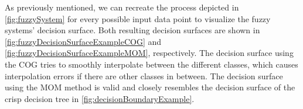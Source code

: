 As previously mentioned, we can recreate the process depicted in \autoref{fig:fuzzySystem} for every possible input data point to visualize the fuzzy systems' decision surface. Both resulting decision surfaces are shown in \autoref{fig:fuzzyDecisionSurfaceExampleCOG} and \autoref{fig:fuzzyDecisionSurfaceExampleMOM}, respectively. The decision surface using the COG tries to smoothly interpolate between the different classes, which causes interpolation errors if there are other classes in between. The decision surface using the MOM method is valid and closely resembles the decision surface of the crisp decision tree in \autoref{fig:decisionBoundaryExample}.

\begin{figure}[H]
    \centering
    \begin{subfigure}[t]{0.48\textwidth}
        \centering
\end{subfigure}
\end{figure}

